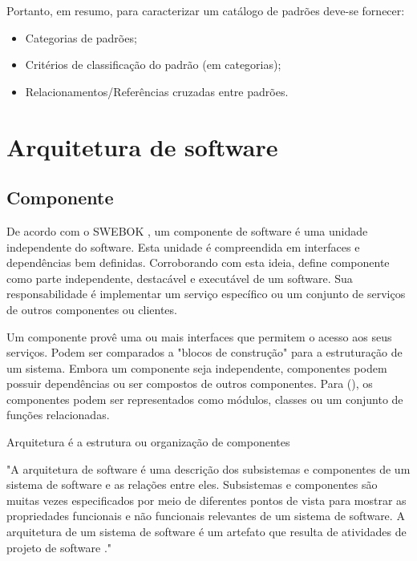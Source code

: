 Portanto, em resumo, para caracterizar um catálogo de padrões deve-se fornecer:

\begin{itemize}
    \item Categorias de padrões;
    \item Critérios de classificação do padrão (em categorias);
    \item Relacionamentos/Referências cruzadas entre padrões.
\end{itemize}



\section{Arquitetura de software}

\subsection{Componente}

De acordo com o SWEBOK \cite{swebok}, um componente de software é uma unidade independente do software. Esta unidade é compreendida em interfaces e dependências bem definidas. Corroborando com esta ideia, \citeauthor{buschmann2007} define componente como parte independente, destacável e executável de um software. Sua responsabilidade é implementar um serviço específico ou um conjunto de serviços de outros componentes ou clientes. 

Um componente provê uma ou mais interfaces que permitem o acesso aos seus serviços. Podem ser comparados a "blocos de construção" para a estruturação de um sistema. Embora um componente seja independente, componentes podem possuir dependências ou ser compostos de outros componentes. Para \citeauthor{buschmann2007} (\citeyear{buschmann2007}), os componentes podem ser representados como módulos, classes ou um conjunto de funções relacionadas. 

Arquitetura é a estrutura ou organização de componentes 

\begin{citacao}
"A arquitetura de software é uma descrição dos subsistemas e componentes de um sistema de software e as relações entre eles. Subsistemas e componentes são muitas vezes especificados por meio de diferentes pontos de vista para mostrar as propriedades funcionais e não funcionais relevantes de um sistema de software. A arquitetura de um sistema de software é um artefato que resulta de atividades de projeto de software \cite{buschmann2007}."
\end{citacao}

